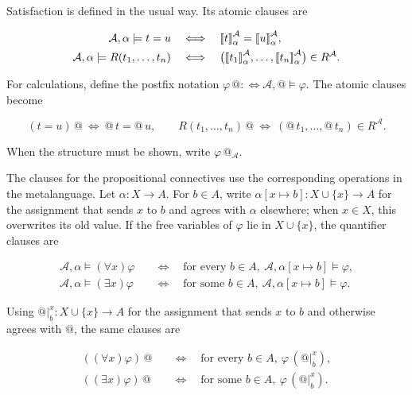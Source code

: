 \documentclass[11pt]{article}
\makeatletter
\newcommand{\llbracket}{\mathopen{[\mkern-3mu[}}
\newcommand{\rrbracket}{\mathclose{]\mkern-3mu]}}
\newcommand{\atsign}{\mathord{@}}
\theoremstyle{definition}
\makeatother
\begin{document}
Satisfaction is defined in the usual way. Its atomic clauses are

\[
\begin{aligned}
\mathcal A,\alpha\models t=u
&\quad\Longleftrightarrow\quad
\llbracket t\rrbracket^{\mathcal A}_\alpha
=\llbracket u\rrbracket^{\mathcal A}_\alpha,\\
\mathcal A,\alpha\models R(t_1,\ldots,t_n)
&\quad\Longleftrightarrow\quad
\bigl(\llbracket t_1\rrbracket^{\mathcal A}_\alpha,\ldots,
\llbracket t_n\rrbracket^{\mathcal A}_\alpha\bigr)
\in R^{\mathcal A}.
\end{aligned}
\]

For calculations, define the postfix notation
\(\varphi\,\atsign:\!\Longleftrightarrow
\mathcal A,\atsign\models\varphi\). The atomic clauses become

\[
(t=u)\,\atsign\ \Longleftrightarrow\ \atsign\,t=\atsign\,u,
\qquad
R(t_1,\ldots,t_n)\,\atsign\ \Longleftrightarrow\ 
(\atsign\,t_1,\ldots,\atsign\,t_n)\in R^{\mathcal A}.
\]

When the structure must be shown, write
\(\varphi\,\atsign_{\mathcal A}\).

The clauses for the propositional connectives use the corresponding
operations in the metalanguage. Let \(\alpha:X\to A\). For \(b\in A\), write
\(\alpha[x\mapsto b]:X\cup\{x\}\to A\) for the assignment that sends
\(x\) to \(b\) and agrees with \(\alpha\) elsewhere; when \(x\in X\), this
overwrites its old value. If the free variables of \(\varphi\) lie in
\(X\cup\{x\}\), the quantifier clauses are

\[
\begin{aligned}
\mathcal A,\alpha\models(\forall x)\varphi
&\quad\Longleftrightarrow\quad
\text{for every }b\in A,
\ \mathcal A,\alpha[x\mapsto b]\models\varphi,\\
\mathcal A,\alpha\models(\exists x)\varphi
&\quad\Longleftrightarrow\quad
\text{for some }b\in A,
\ \mathcal A,\alpha[x\mapsto b]\models\varphi.
\end{aligned}
\]

Using \(\atsign\vert_b^x:X\cup\{x\}\to A\) for the assignment that sends
\(x\) to \(b\) and otherwise agrees with \(\atsign\), the same clauses are

\[
\begin{aligned}
((\forall x)\varphi)\,\atsign
&\quad\Longleftrightarrow\quad
\text{for every }b\in A,\ \varphi\,(\atsign\vert_b^x),\\
((\exists x)\varphi)\,\atsign
&\quad\Longleftrightarrow\quad
\text{for some }b\in A,\ \varphi\,(\atsign\vert_b^x).
\end{aligned}
\]
\end{document}
